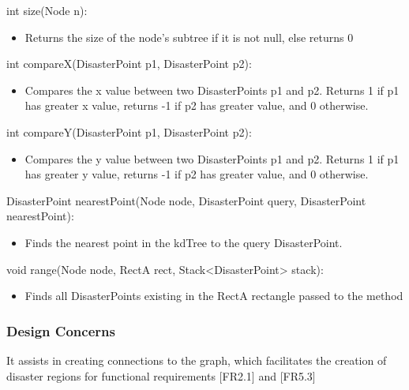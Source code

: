 \documentclass[12pt]{article}
\begin{document}
                \noindent int size(Node n):
			    \begin{itemize}
			        \item Returns the size of the node's subtree if it is not null, else returns 0
			    \end{itemize}
			    
                \noindent int compareX(DisasterPoint p1, DisasterPoint p2):
			    \begin{itemize}
			        \item Compares the x value between two DisasterPoints p1 and p2.
                	 Returns 1 if p1 has greater x value, returns -1 if p2 has
                	 greater value, and 0 otherwise.
			    \end{itemize}
			    
                \noindent int compareY(DisasterPoint p1, DisasterPoint p2):
			    \begin{itemize}
			        \item Compares the y value between two DisasterPoints p1 and p2.
                	 Returns 1 if p1 has greater y value, returns -1 if p2 has
                	 greater value, and 0 otherwise.
			    \end{itemize}
			    
                \noindent DisasterPoint nearestPoint(Node node, DisasterPoint query, DisasterPoint nearestPoint):
			    \begin{itemize}
			        \item Finds the nearest point in the kdTree to the query DisasterPoint.
			    \end{itemize}
			    
                \noindent void range(Node node, RectA rect, Stack<DisasterPoint> stack):
			    \begin{itemize}
			        \item Finds all DisasterPoints existing in the RectA rectangle passed to the method
			    \end{itemize}
                
                \subsubsection* {Design Concerns}
                It assists in creating connections to the graph, which facilitates the creation of disaster regions for
                functional requirements [FR2.1] and [FR5.3]
                
                 \newpage
\end{document}
